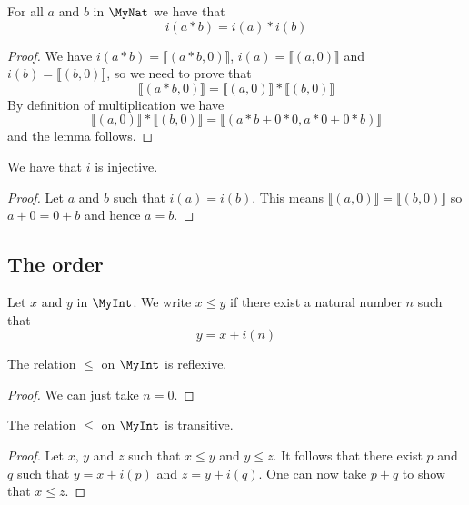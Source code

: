 \begin{lemma}
    \label{MyInt.i_mul}
    \leanok
For all $a$ and $b$ in $\MyNat$ we have that
\[
i(a*b) = i(a) * i(b)
\]
\end{lemma}
\begin{proof}
    \leanok
    We have $i(a*b) = ⟦ (a*b, 0) ⟧$, $i(a) = ⟦ (a, 0) ⟧$ and
    $i(b) = ⟦ (b, 0) ⟧$, so we need to prove that
\[
⟦ (a*b, 0) ⟧ = ⟦ (a, 0) ⟧ * ⟦ (b, 0) ⟧
\]
By definition of multiplication we have
\[
⟦ (a, 0) ⟧ * ⟦ (b, 0) ⟧ = ⟦ (a*b+0*0, a*0+0*b) ⟧
\]
and the lemma follows.
\end{proof}

\begin{lemma}
    \label{MyInt.i_injective}
    \leanok
    We have that $i$ is injective.
\end{lemma}
\begin{proof}
    \leanok
    Let $a$ and $b$ such that $i(a)=i(b)$. This means $⟦ (a,0) ⟧ = ⟦ (b,0) ⟧$ so $a + 0 = 0 + b$ and hence $a = b$.
\end{proof}

\subsection{The order}

\begin{definition}
    \label{MyInt.le}
    \leanok
Let $x$ and $y$ in $\MyInt$. We write $x \leq y$ if there exist a natural number $n$ such that
\[
y = x + i(n)
\]
\end{definition}

\begin{lemma}
    \label{MyInt.le_refl}
    \leanok
    The relation $\leq$ on $\MyInt$ is reflexive.
\end{lemma}
\begin{proof}
    \leanok
    We can just take $n = 0$.
\end{proof}

\begin{lemma}
    \label{MyInt.le_trans}
    \leanok
    The relation $\leq$ on $\MyInt$ is transitive.
\end{lemma}
\begin{proof}
    \leanok
    Let $x$, $y$ and $z$ such that $x \leq y$ and $y \leq z$. It follows that there exist $p$ and $q$
    such that $y = x + i(p)$ and $z = y + i(q)$. One can now take $p+q$ to show that $x \leq z$.
\end{proof}

